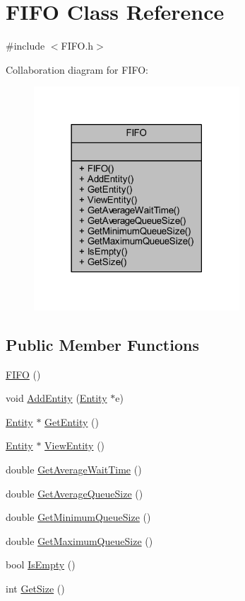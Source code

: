 \hypertarget{class_f_i_f_o}{}\section{F\+I\+FO Class Reference}
\label{class_f_i_f_o}


{\ttfamily \#include $<$F\+I\+F\+O.\+h$>$}



Collaboration diagram for F\+I\+FO\+:\nopagebreak
\begin{figure}[H]
\begin{center}
\leavevmode
\includegraphics[width=218pt]{class_f_i_f_o__coll__graph}
\end{center}
\end{figure}
\subsection*{Public Member Functions}
\begin{DoxyCompactItemize}
\item 
\hyperlink{class_f_i_f_o_aea969385961885a8e70732482d64fead}{F\+I\+FO} ()
\item 
void \hyperlink{class_f_i_f_o_a7255ba93981ed0662bc4c26d9983dc9e}{Add\+Entity} (\hyperlink{class_entity}{Entity} $\ast$e)
\item 
\hyperlink{class_entity}{Entity} $\ast$ \hyperlink{class_f_i_f_o_a428f7532d582435ee5710641f0f87bfd}{Get\+Entity} ()
\item 
\hyperlink{class_entity}{Entity} $\ast$ \hyperlink{class_f_i_f_o_a4ce6b8e9afc3c29c9a7f1a4e0fdc81ec}{View\+Entity} ()
\item 
double \hyperlink{class_f_i_f_o_abf4a95cb154b2bb4eb6bb3750a6fce3d}{Get\+Average\+Wait\+Time} ()
\item 
double \hyperlink{class_f_i_f_o_a739f5e90efc37fcea0f66e5548132d5f}{Get\+Average\+Queue\+Size} ()
\item 
double \hyperlink{class_f_i_f_o_ad28e880c6365098995f45fc9f14121ef}{Get\+Minimum\+Queue\+Size} ()
\item 
double \hyperlink{class_f_i_f_o_a77a83086bafa4145487dd2918ed36aa4}{Get\+Maximum\+Queue\+Size} ()
\item 
bool \hyperlink{class_f_i_f_o_a8dd1be7a3e1ada7cafe5fc85a7211408}{Is\+Empty} ()
\item 
int \hyperlink{class_f_i_f_o_a67cb60ba28bfe8efd4aae30c303aa296}{Get\+Size} ()
\end{DoxyCompactItemize}


